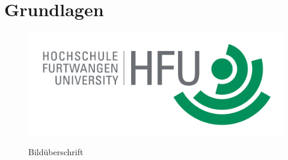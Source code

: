 \chapter{Grundlagen}
\begin{figure}
\caption{Bildüberschrift}
\includegraphics[width=1\textwidth]{content/pictures/hfu}
\label{pic:bild3}
\end{figure}